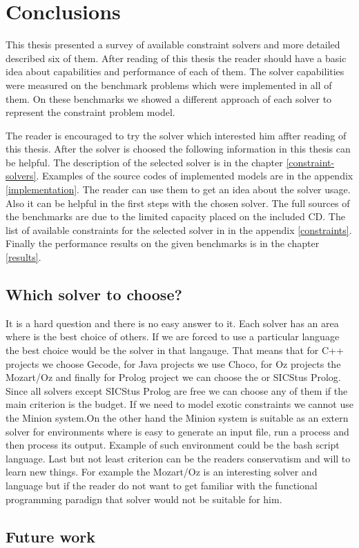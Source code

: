 \chapter{Conclusions}
\thispagestyle{myheadings}

This thesis presented a survey of available constraint solvers and more detailed 
described six of them. After reading of this thesis the reader should have a 
basic idea about capabilities and performance of each of them. The solver capabilities 
were measured on the benchmark problems which were implemented in all of them.
On these benchmarks we showed a different approach of each solver to represent
the constraint problem model. 

The reader is encouraged to try the solver which interested him affter reading of this thesis. 
After the solver is choosed the following information in this thesis can be helpful. 
The description of the selected solver is in the chapter \ref{constraint-solvers}.
Examples of the source codes of implemented models are in the appendix \ref{implementation}.
The reader can use them to get an idea about the solver usage. Also it can 
be helpful in the first steps with the chosen solver. The full sources of the benchmarks
are due to the limited capacity placed on the included CD. The list of available constraints
for the selected solver in in the appendix \ref{constraints}. Finally the performance results
 on the given benchmarks is in the chapter \ref{results}.
 
\section{Which solver to choose?}
It is a hard question and there is no easy answer to it. Each solver has an area where
is the best choice of others. If we are forced to use a particular language the best choice
would be the solver in that langauge. That means that for C++ projects we choose Gecode,
for Java projects we use Choco, for Oz projects the Mozart/Oz and finally for Prolog
project we can choose the \eclipse or SICStus Prolog. Since all solvers except SICStus Prolog are free
we can choose any of them if the main criterion is the budget. If we need to model 
exotic constraints we cannot use the Minion system.On the other hand the Minion system
is suitable as an extern solver for environments where is easy to generate an input
file, run a process and then process its output. Example of such environment could
be the bash script language. Last but not least criterion can be the readers conservatism and 
will to learn new things. For example the Mozart/Oz is an interesting solver and language
but if the reader do not want to get familiar with the functional programming paradign that solver would
not be suitable for him.

\section{Future work}
  